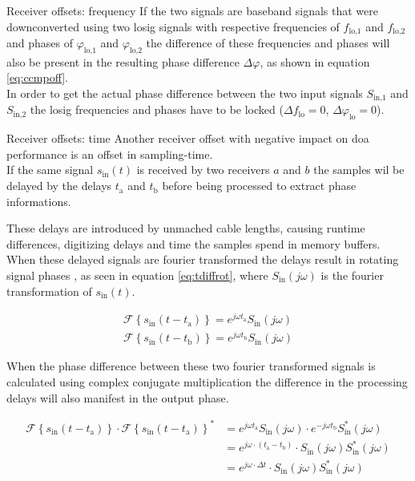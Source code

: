 \begin{subchapter}{Receiver offsets: frequency}
  If the two signals are baseband signals that
  were downconverted using two \gls{losig} signals
  with respective frequencies of $f_\text{lo,1}$ and
  $f_\text{lo,2}$ and phases of $\varphi_\text{lo,1}$
  and $\varphi_\text{lo,2}$ the difference of
  these frequencies and phases will also be present
  in the resulting phase difference $\Delta \varphi$,
  as shown in equation \ref{eq:ccmpoff}. \\

  In order to get the actual phase difference between
  the two input signals $S_\text{in,1}$ and $S_\text{in,2}$
  the \gls{losig} frequencies and phases have to be
  locked ($\Delta f_\text{lo} = 0$, $\Delta \varphi_\text{lo} = 0$).
\end{subchapter}

\begin{subchapter}{Receiver offsets: time}
  Another receiver offset with negative impact on
  \gls{doa} performance is an offset in sampling-time. \\

  If the same signal $s_\text{in}(t)$ is received
  by two receivers $a$ and $b$ the samples wil be
  delayed by the delays $t_\text{a}$ and $t_\text{b}$ before
  being processed to extract phase informations.

  These delays are introduced by unmached cable lengths,
  causing runtime differences, digitizing delays and
  time the samples spend in memory buffers. \\

  When these delayed signals are fourier transformed the
  delays result in rotating signal phases
  \cite[p. 802]{bronstein2016}, as seen in equation
  \ref{eq:tdiffrot}, where $S_\text{in}(j \omega)$ is the fourier
  transformation of $s_\text{in}(t)$.

  \begin{align}
    \label{eq:tdiffrot}
    \mathcal{F} \left\{ s_\text{in}(t - t_\text{a}) \right\}
    = e^{j \omega t_\text{a}} S_\text{in}(j \omega) \\
    \mathcal{F} \left\{ s_\text{in}(t - t_\text{b}) \right\}
    = e^{j \omega t_\text{b}} S_\text{in}(j \omega) \nonumber
  \end{align}

  When the phase difference between these two fourier
  transformed signals is calculated using complex conjugate
  multiplication the difference in the processing delays
  will also manifest in the output phase.

  \begin{align}
    \mathcal{F} \left\{ s_\text{in}(t - t_\text{a}) \right\} \cdot
    \mathcal{F} \left\{ s_\text{in}(t - t_\text{a}) \right\}^\ast
    &=
    e^{ j \omega t_\text{a}} S_\text{in}(j \omega) \cdot
    e^{-j \omega t_\text{b}} S_\text{in}^\ast(j \omega) \\
    &=
    e^{ j \omega \cdot (t_\text{a} - t_\text{b})} \cdot
    S_\text{in}(j \omega) S_\text{in}^\ast(j \omega) \\
    &=
    e^{ j \omega \cdot \Delta t} \cdot
    S_\text{in}(j \omega) S_\text{in}^\ast(j \omega)
  \end{align}


\end{subchapter}

